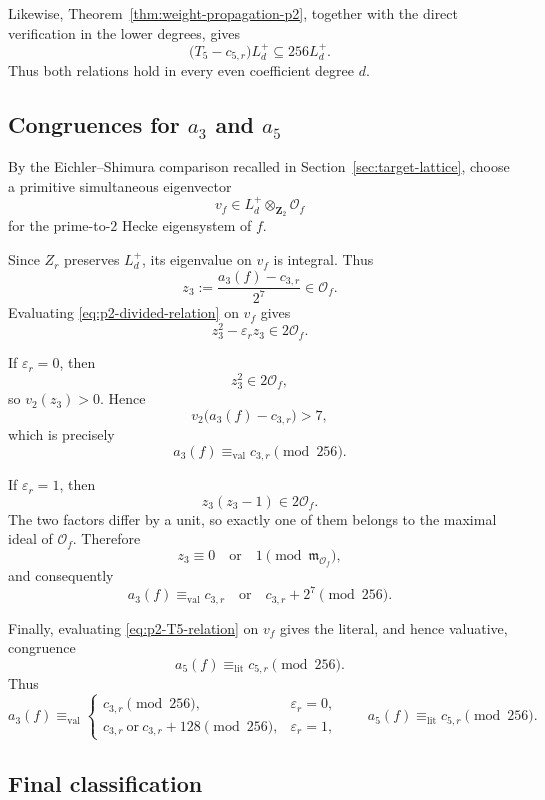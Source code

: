 \documentclass[11pt]{article}
\theoremstyle{plain}
\theoremstyle{definition}
\theoremstyle{remark}
\numberwithin{equation}{section}
\begin{document}
Likewise, Theorem~\ref{thm:weight-propagation-p2}, together with the direct verification in the lower degrees, gives \begin{equation} \bigl(T_5-c_{5,r}\bigr)L_d^+ \subseteq256L_d^+. \label{eq:p2-T5-relation} \end{equation} Thus both relations hold in every even coefficient degree \(d\).

\subsection{Congruences for \texorpdfstring{\(a_3\)}{a3} and
\texorpdfstring{\(a_5\)}{a5}}

By the Eichler--Shimura comparison recalled in Section~\ref{sec:target-lattice}, choose a primitive simultaneous eigenvector \[ v_f\in L_d^+\otimes_{\mathbf Z_2}\mathcal O_f \] for the prime-to-\(2\) Hecke eigensystem of \(f\). 

Since \(Z_r\) preserves \(L_d^+\), its eigenvalue on \(v_f\) is integral.  Thus \[ z_3:=\frac{a_3(f)-c_{3,r}}{2^7}\in\mathcal O_f. \] Evaluating \eqref{eq:p2-divided-relation} on \(v_f\) gives \[ z_3^2-\varepsilon_rz_3\in2\mathcal O_f. \]

If \(\varepsilon_r=0\), then \[ z_3^2\in2\mathcal O_f, \] so \(v_2(z_3)>0\).  Hence \[ v_2\bigl(a_3(f)-c_{3,r}\bigr)>7, \] which is precisely \[ a_3(f)\equiv_{\mathrm{val}}c_{3,r}\pmod{256}. \]

If \(\varepsilon_r=1\), then \[ z_3(z_3-1)\in2\mathcal O_f. \] The two factors differ by a unit, so exactly one of them belongs to the maximal ideal of \(\mathcal O_f\).  Therefore \[z_3\equiv0\quad\text{or}\quad1 \pmod{\mathfrak m_{\mathcal O_f}}, \] and consequently \[ a_3(f)\equiv_{\mathrm{val}} c_{3,r}\quad\text{or}\quad c_{3,r}+2^7 \pmod{256}. \]

Finally, evaluating \eqref{eq:p2-T5-relation} on \(v_f\) gives the literal, and hence valuative, congruence \[ a_5(f)\equiv_{\mathrm{lit}}c_{5,r}\pmod{256}. \] Thus \begin{equation} a_3(f)\equiv_{\mathrm{val}} \begin{cases} c_{3,r}\pmod{256},&\varepsilon_r=0,\\ c_{3,r}\ \text{or}\ c_{3,r}+128\pmod{256},  &\varepsilon_r=1, \end{cases} \qquad a_5(f)\equiv_{\mathrm{lit}}c_{5,r}\pmod{256}. \label{eq:p2-coordinate-classification} \end{equation}

\subsection{Final classification}
\end{document}
